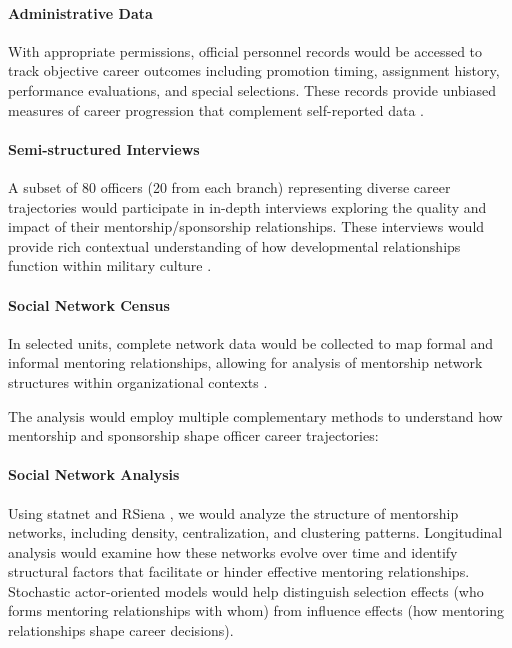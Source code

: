 \documentclass[main.tex]{subfiles}
\begin{document}
\paragraph{Administrative Data} With appropriate permissions, official personnel records would be accessed to track objective career outcomes including promotion timing, assignment history, performance evaluations, and special selections. These records provide unbiased measures of career progression that complement self-reported data \parencite{misq2008career}.

\paragraph{Semi-structured Interviews} A subset of 80 officers (20 from each branch) representing diverse career trajectories would participate in in-depth interviews exploring the quality and impact of their mentorship/sponsorship relationships. These interviews would provide rich contextual understanding of how developmental relationships function within military culture \parencite{alachkar2023sponsor}.

\paragraph{Social Network Census} In selected units, complete network data would be collected to map formal and informal mentoring relationships, allowing for analysis of mentorship network structures within organizational contexts \parencite{cdc2015network}.


The analysis would employ multiple complementary methods to understand how mentorship and sponsorship shape officer career trajectories:

\paragraph{Social Network Analysis} Using statnet \parencite{cran2023statnet} and RSiena \parencite{cran2023rsiena}, we would analyze the structure of mentorship networks, including density, centralization, and clustering patterns. Longitudinal analysis would examine how these networks evolve over time and identify structural factors that facilitate or hinder effective mentoring relationships. Stochastic actor-oriented models would help distinguish selection effects (who forms mentoring relationships with whom) from influence effects (how mentoring relationships shape career decisions).
\end{document}
